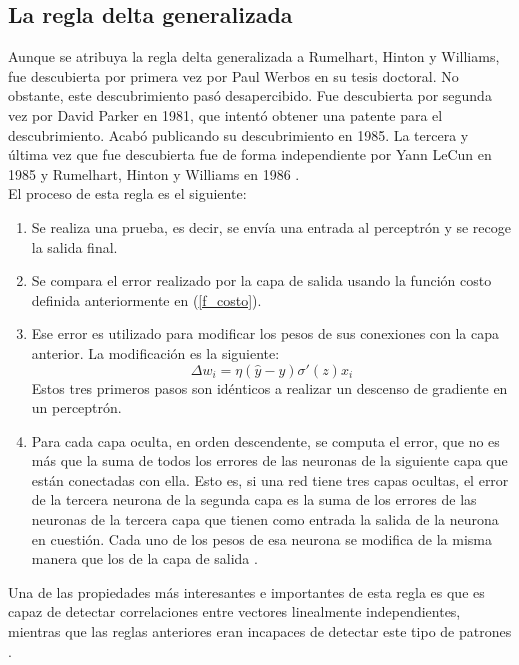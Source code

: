 \documentclass[11pt,twoside,titlepage,a4paper]{article}
\numberwithin{equation}{section} %
\theoremstyle{usual}
\begin{document}
\subsection{La regla delta generalizada}

Aunque se atribuya la regla delta generalizada a Rumelhart, Hinton y Williams,
fue descubierta por primera vez por Paul Werbos en su tesis doctoral. No
obstante, este descubrimiento pasó desapercibido. Fue descubierta por segunda
vez por David Parker en 1981, que intentó obtener una patente para el
descubrimiento. Acabó publicando su descubrimiento en 1985. La tercera y
última vez que fue descubierta fue de forma independiente por Yann LeCun en
1985 y Rumelhart, Hinton y Williams en 1986 \cite{skansi}.\\

El proceso de esta regla es el siguiente:

\begin{enumerate}
    \item Se realiza una prueba, es decir, se envía una entrada al perceptrón
    y se recoge la salida final.
    \item Se compara el error realizado por la capa de salida usando la 
    función costo definida anteriormente en (\ref{f_costo}).
    \item Ese error es utilizado para modificar los pesos de sus conexiones
    con la capa anterior. La modificación es la siguiente:
    \begin{equation}
        \Delta w_i=\eta(\hat{y}-y)\sigma'(z)x_i
    \end{equation}
    Estos tres primeros pasos son idénticos a realizar un descenso de 
    gradiente en un perceptrón.
    \item Para cada capa oculta, en orden descendente, se computa el error,
    que no es más que la suma de todos los errores de las neuronas de la
    siguiente capa que están conectadas con ella. Esto es, si una red
    tiene tres capas ocultas, el error de la tercera neurona de la segunda
    capa es la suma de los errores de las neuronas de la tercera capa que
    tienen como entrada la salida de la neurona en cuestión. Cada uno de
    los pesos de esa neurona se modifica de la misma manera que los de
    la capa de salida \cite{deltarule-process}.
\end{enumerate}
 
 Una de las propiedades más interesantes e importantes de esta regla es que
 es capaz de detectar correlaciones entre vectores linealmente independientes,
 mientras que las reglas anteriores eran incapaces de detectar este tipo
 de patrones \cite{deltarule-advantages}. 
\end{document}
